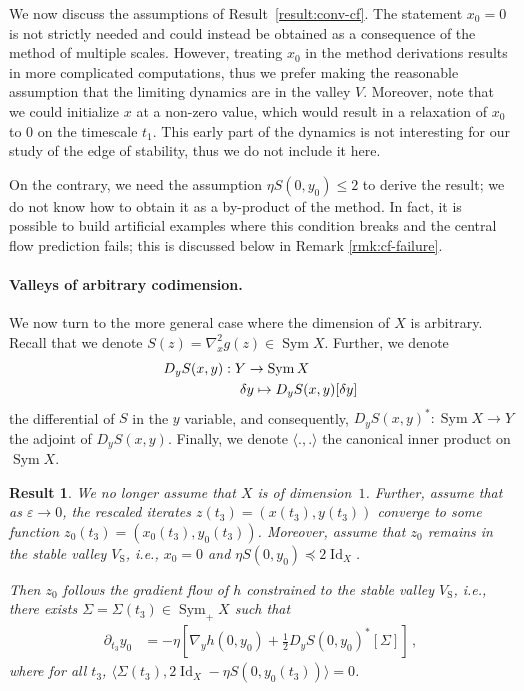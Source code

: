 \documentclass[11pt,english,reqno]{article}
\DeclareMathOperator{\Id}{Id}
\DeclareMathOperator{\Sym}{Sym}
\renewcommand{\leq}{\leqslant}
\theoremstyle{plain}
\newtheorem{result}[proposition]{Result}
\theoremstyle{definition}
\theoremstyle{remark}
\numberwithin{equation}{section}
\begin{document}
We now discuss the assumptions of Result~\ref{result:conv-cf}. The statement $x_0 = 0$ is not strictly needed and could instead be obtained as a consequence of the method of multiple scales. However, treating $x_0$ in the method derivations results in more complicated computations, thus we prefer making the reasonable assumption that the limiting dynamics are in the valley $V$. Moreover, note that we could initialize $x$ at a non-zero value, which would result in a relaxation of $x_0$ to $0$ on the timescale $t_1$. This early part of the dynamics is not interesting for our study of the edge of stability, thus we do not include it here. 

On the contrary, we need the assumption $\eta S(0,y_0) \leq 2$ to derive the result; we do not know how to obtain it as a by-product of the method. In fact, it is possible to build artificial examples where this condition breaks and the central flow prediction fails; this is discussed below in Remark \ref{rmk:cf-failure}. 

\paragraph{Valleys of arbitrary codimension.}We now turn to the more general case where the dimension of $X$ is arbitrary. Recall that we denote $S(z) = \nabla^2_x g(z) \in \Sym X$. Further, we denote 
\begin{align*}
        &D_y S(x,y) : Y \to \Sym X  \\
    &\hspace{5.5em} \delta y \mapsto D_y S(x,y)[\delta y] 
\end{align*}
the differential of $S$ in the $y$ variable, and consequently, $D_y S(x,y)^* : \Sym X \to Y$ the adjoint of $D_y S(x,y)$. Finally, we denote $\langle ., . \rangle$ the canonical inner product on $\Sym X$. 

\begin{result}
    \label{result:conv-cf-general}
    We no longer assume that $X$ is of dimension~$1$. Further, assume that as $\varepsilon \to 0$, the rescaled iterates $z(t_3) = (x(t_3), y(t_3))$ converge to some function $z_0(t_3) = (x_0(t_3), y_0(t_3))$. Moreover, assume that $z_0$ remains in the stable valley $V_{\mathrm{S}}$, i.e., $x_0 = 0$ and $\eta S(0, y_0) \preccurlyeq 2 \Id_X$. 

    Then $z_0$ follows the gradient flow of $h$ constrained to the stable valley $V_{\mathrm{S}}$, i.e., there exists $\Sigma = \Sigma(t_3) \in \Sym_+ X$ such that 
    \begin{align*}
        \partial_{t_3} y_0 &= - \eta \left[\nabla_y h(0, y_0) +\frac{1}{2} D_y S(0, y_0)^*[\Sigma] \right] \, , 
    \end{align*}
    where for all $t_3$, $\langle \Sigma(t_3), 2 \Id_X - \eta S(0, y_0(t_3)) \rangle = 0$. 
\end{result}
\end{document}
